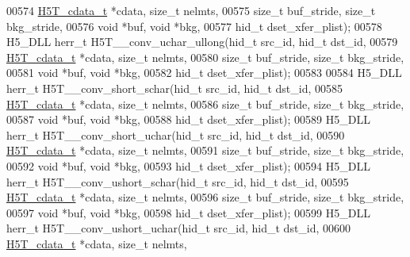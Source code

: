 \begin{DoxyCode}
00574                     \hyperlink{struct_h5_t__cdata__t}{H5T\_cdata\_t} *cdata, \textcolor{keywordtype}{size\_t} nelmts,
00575                     \textcolor{keywordtype}{size\_t} buf\_stride, \textcolor{keywordtype}{size\_t} bkg\_stride,
00576                                     \textcolor{keywordtype}{void} *buf, \textcolor{keywordtype}{void} *bkg,
00577                                     hid\_t dset\_xfer\_plist);
00578 H5\_DLL herr\_t H5T\_\_conv\_uchar\_ullong(hid\_t src\_id, hid\_t dst\_id,
00579                      \hyperlink{struct_h5_t__cdata__t}{H5T\_cdata\_t} *cdata, \textcolor{keywordtype}{size\_t} nelmts,
00580                      \textcolor{keywordtype}{size\_t} buf\_stride, \textcolor{keywordtype}{size\_t} bkg\_stride,
00581                                      \textcolor{keywordtype}{void} *buf, \textcolor{keywordtype}{void} *bkg,
00582                                      hid\_t dset\_xfer\_plist);
00583 
00584 H5\_DLL herr\_t H5T\_\_conv\_short\_schar(hid\_t src\_id, hid\_t dst\_id,
00585                     \hyperlink{struct_h5_t__cdata__t}{H5T\_cdata\_t} *cdata, \textcolor{keywordtype}{size\_t} nelmts,
00586                     \textcolor{keywordtype}{size\_t} buf\_stride, \textcolor{keywordtype}{size\_t} bkg\_stride,
00587                                     \textcolor{keywordtype}{void} *buf, \textcolor{keywordtype}{void} *bkg,
00588                                     hid\_t dset\_xfer\_plist);
00589 H5\_DLL herr\_t H5T\_\_conv\_short\_uchar(hid\_t src\_id, hid\_t dst\_id,
00590                     \hyperlink{struct_h5_t__cdata__t}{H5T\_cdata\_t} *cdata, \textcolor{keywordtype}{size\_t} nelmts,
00591                     \textcolor{keywordtype}{size\_t} buf\_stride, \textcolor{keywordtype}{size\_t} bkg\_stride,
00592                                     \textcolor{keywordtype}{void} *buf, \textcolor{keywordtype}{void} *bkg,
00593                                     hid\_t dset\_xfer\_plist);
00594 H5\_DLL herr\_t H5T\_\_conv\_ushort\_schar(hid\_t src\_id, hid\_t dst\_id,
00595                      \hyperlink{struct_h5_t__cdata__t}{H5T\_cdata\_t} *cdata, \textcolor{keywordtype}{size\_t} nelmts,
00596                      \textcolor{keywordtype}{size\_t} buf\_stride, \textcolor{keywordtype}{size\_t} bkg\_stride,
00597                                      \textcolor{keywordtype}{void} *buf, \textcolor{keywordtype}{void} *bkg,
00598                                      hid\_t dset\_xfer\_plist);
00599 H5\_DLL herr\_t H5T\_\_conv\_ushort\_uchar(hid\_t src\_id, hid\_t dst\_id,
00600                      \hyperlink{struct_h5_t__cdata__t}{H5T\_cdata\_t} *cdata, \textcolor{keywordtype}{size\_t} nelmts,

\end{DoxyCode}
